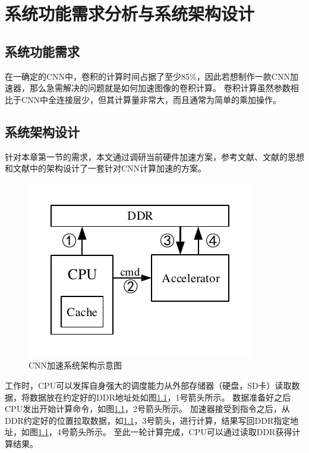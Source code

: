 \chapter{系统功能需求分析与系统架构设计}

\section{系统功能需求}
在一确定的CNN中，卷积的计算时间占据了至少85\%\cite{chen2017eyeriss}，因此若想制作一款CNN加速器，那么急需解决的问题就是如何加速图像的卷积计算。
卷积计算虽然参数相比于CNN中全连接层少，但其计算量非常大，而且通常为简单的乘加操作。

\section{系统架构设计}
    针对本章第一节的需求，本文通过调研当前硬件加速方案，参考文献\cite{chen2017eyeriss}、文献\cite{chen2016eyeriss}的思想和文献\cite{sun2018high}中的架构设计了一套针对CNN计算加速的方案。
    \begin{figure}[h]
        \centering
        \includegraphics{../pdf/system.pdf}
        \caption{CNN加速系统架构示意图}
        \label{sys}
    \end{figure}
    工作时，CPU可以发挥自身强大的调度能力从外部存储器（硬盘，SD卡）读取数据，将数据放在约定好的DDR地址处如图\ref{sys}，1号箭头所示。
    数据准备好之后CPU发出开始计算命令，如图\ref{sys}，2号箭头所示。
    加速器接受到指令之后，从DDR约定好的位置拉取数据，如\ref{sys}，3号箭头，进行计算，结果写回DDR指定地址，如图\ref{sys}，4号箭头所示。
    至此一轮计算完成，CPU可以通过读取DDR获得计算结果。


